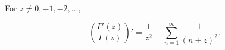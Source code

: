 For $z \neq 0, -1, -2, \ldots$,

$$\left( \frac{\Gamma'(z)}{\Gamma(z)} \right)' = \frac{1}{z^2} + \sum_{n=1}^{\infty} \frac{1}{(n+z)^2}.$$
